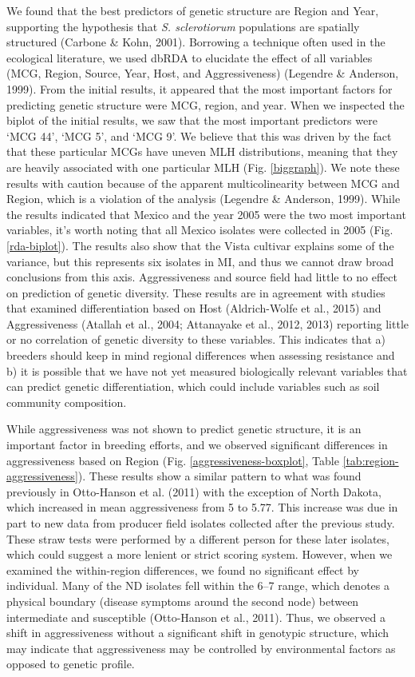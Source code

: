 \documentclass[fleqn,10pt,lineno]{wlpeerj} %
\theoremstyle{definition}
\theoremstyle{definition}
\theoremstyle{definition}
\theoremstyle{remark}
\begin{document}
We found that the best predictors of genetic structure are Region and
Year, supporting the hypothesis that \emph{S. sclerotiorum} populations
are spatially structured (Carbone \& Kohn, 2001). Borrowing a technique
often used in the ecological literature, we used dbRDA to elucidate the
effect of all variables (MCG, Region, Source, Year, Host, and
Aggressiveness) (Legendre \& Anderson, 1999). From the initial results,
it appeared that the most important factors for predicting genetic
structure were MCG, region, and year. When we inspected the biplot of
the initial results, we saw that the most important predictors were `MCG
44', `MCG 5', and `MCG 9'. We believe that this was driven by the fact
that these particular MCGs have uneven MLH distributions, meaning that
they are heavily associated with one particular MLH (Fig.
\ref{biggraph}). We note these results with caution because of the
apparent multicolinearity between MCG and Region, which is a violation
of the analysis (Legendre \& Anderson, 1999). While the results
indicated that Mexico and the year 2005 were the two most important
variables, it's worth noting that all Mexico isolates were collected in
2005 (Fig. \ref{rda-biplot}). The results also show that the Vista
cultivar explains some of the variance, but this represents six isolates
in MI, and thus we cannot draw broad conclusions from this axis.
Aggressiveness and source field had little to no effect on prediction of
genetic diversity. These results are in agreement with studies that
examined differentiation based on Host (Aldrich-Wolfe et al., 2015) and
Aggressiveness (Atallah et al., 2004; Attanayake et al., 2012, 2013)
reporting little or no correlation of genetic diversity to these
variables. This indicates that a) breeders should keep in mind regional
differences when assessing resistance and b) it is possible that we have
not yet measured biologically relevant variables that can predict
genetic differentiation, which could include variables such as soil
community composition.

While aggressiveness was not shown to predict genetic structure, it is
an important factor in breeding efforts, and we observed significant
differences in aggressiveness based on Region (Fig.
\ref{aggressiveness-boxplot}, Table \ref{tab:region-aggressiveness}).
These results show a similar pattern to what was found previously in
Otto-Hanson et al. (2011) with the exception of North Dakota, which
increased in mean aggressiveness from 5 to 5.77. This increase was due
in part to new data from producer field isolates collected after the
previous study. These straw tests were performed by a different person
for these later isolates, which could suggest a more lenient or strict
scoring system. However, when we examined the within-region differences,
we found no significant effect by individual. Many of the ND isolates
fell within the 6--7 range, which denotes a physical boundary (disease
symptoms around the second node) between intermediate and susceptible
(Otto-Hanson et al., 2011). Thus, we observed a shift in aggressiveness
without a significant shift in genotypic structure, which may indicate
that aggressiveness may be controlled by environmental factors as
opposed to genetic profile.
\end{document}
